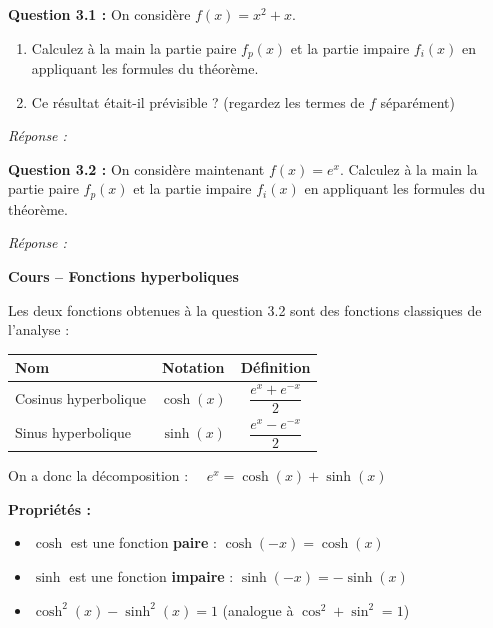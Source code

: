\documentclass[12pt,a4paper]{article}
\newcommand{\cadreReponse}[1][4]{%
    \begin{mdframed}[backgroundcolor=repbg, linecolor=repframe, linewidth=1pt,
        roundcorner=4pt, innertopmargin=6pt, innerbottommargin=6pt]
    \textcolor{repframe}{\small\textit{Réponse :}}\\[#1\baselineskip]
    \end{mdframed}%
}
\begin{document}
\begin{exercicebox}
\textbf{Question 3.1 :} On considère $f(x) = x^2 + x$.
\begin{enumerate}[label=\alph*)]
    \item Calculez à la main la partie paire $f_p(x)$ et la partie impaire $f_i(x)$ en appliquant les formules du théorème.
    \item Ce résultat était-il prévisible ? (regardez les termes de $f$ séparément)
\end{enumerate}
\end{exercicebox}

\cadreReponse[6]

\begin{exercicebox}
\textbf{Question 3.2 :} On considère maintenant $f(x) = e^x$. Calculez à la main la partie paire $f_p(x)$ et la partie impaire $f_i(x)$ en appliquant les formules du théorème.
\end{exercicebox}

\cadreReponse[6]


\begin{rappelbox}
\textbf{Cours -- Fonctions hyperboliques}

\medskip
Les deux fonctions obtenues à la question 3.2 sont des fonctions classiques de l'analyse :

\medskip
\renewcommand{\arraystretch}{1.8}
\begin{center}
\begin{tabular}{|l|c|c|}
    \hline
    \textbf{Nom} & \textbf{Notation} & \textbf{Définition} \\
    \hline
    Cosinus hyperbolique & $\cosh(x)$ & $\dfrac{e^x + e^{-x}}{2}$ \\
    \hline
    Sinus hyperbolique   & $\sinh(x)$ & $\dfrac{e^x - e^{-x}}{2}$ \\
    \hline
\end{tabular}
\end{center}

\medskip
On a donc la décomposition : $\quad e^x = \cosh(x) + \sinh(x)$

\medskip
\textbf{Propriétés :}
\begin{itemize}
    \item $\cosh$ est une fonction \textbf{paire} : $\cosh(-x) = \cosh(x)$
    \item $\sinh$ est une fonction \textbf{impaire} : $\sinh(-x) = -\sinh(x)$
    \item $\cosh^2(x) - \sinh^2(x) = 1$ \hfill (analogue à $\cos^2 + \sin^2 = 1$)
\end{itemize}
\end{rappelbox}
\end{document}
